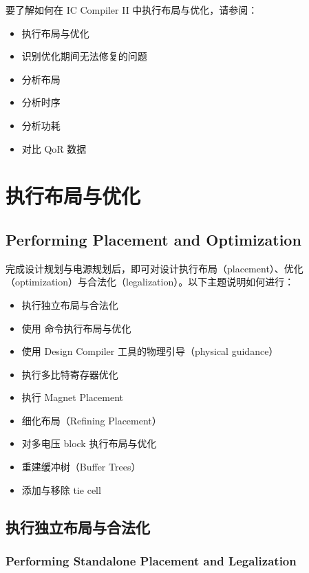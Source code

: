 \label{chap:place}

要了解如何在 IC Compiler II 中执行布局与优化，请参阅：
\begin{itemize}
  \item 执行布局与优化
  \item 识别优化期间无法修复的问题
  \item 分析布局
  \item 分析时序
  \item 分析功耗
  \item 对比 QoR 数据
\end{itemize}

\section{执行布局与优化}
\subsection*{Performing Placement and Optimization}

完成设计规划与电源规划后，即可对设计执行布局（placement）、优化（optimization）与合法化（legalization）。以下主题说明如何进行：
\begin{itemize}
  \item 执行独立布局与合法化
  \item 使用  命令执行布局与优化
  \item 使用 Design Compiler 工具的物理引导（physical guidance）
  \item 执行多比特寄存器优化
  \item 执行 Magnet Placement
  \item 细化布局（Refining Placement）
  \item 对多电压 block 执行布局与优化
  \item 重建缓冲树（Buffer Trees）
  \item 添加与移除 tie cell
\end{itemize}

\subsection{执行独立布局与合法化}
\subsubsection*{Performing Standalone Placement and Legalization}

